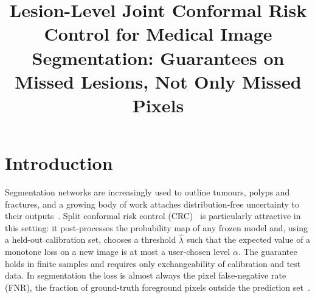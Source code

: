 \documentclass[sn-mathphys-num]{sn-jnl}%
\theoremstyle{thmstyleone}
\theoremstyle{thmstyletwo}
\theoremstyle{thmstylethree}
\newcommand{\1}{\mathbb{1}}
\newcommand{\lhat}{\hat\lambda}
\begin{document}
\title[Lesion-Level Joint Conformal Risk Control for Segmentation]{Lesion-Level Joint Conformal Risk Control for Medical Image Segmentation: Guarantees on Missed Lesions, Not Only Missed Pixels}

\author[1]{ }
\author[1]{ }
\author*[1]{ }




\maketitle

\section{Introduction}\label{sec:intro}

Segmentation networks are increasingly used to outline tumours, polyps and fractures, and a growing body of work attaches distribution-free uncertainty to their outputs~\cite{lambert2024trustworthy,angelopoulos2023gentle}. Split conformal risk control (CRC)~\cite{angelopoulos2024crc} is particularly attractive in this setting: it post-processes the probability map of any frozen model and, using a held-out calibration set, chooses a threshold $\lhat$ such that the expected value of a monotone loss on a new image is at most a user-chosen level $\alpha$. The guarantee holds in finite samples and requires only exchangeability of calibration and test data. In segmentation the loss is almost always the pixel false-negative rate (FNR), the fraction of ground-truth foreground pixels outside the prediction set~\cite{angelopoulos2024crc,luo2025ccra,tan2025cls,resende2026recirc}.
\end{document}

